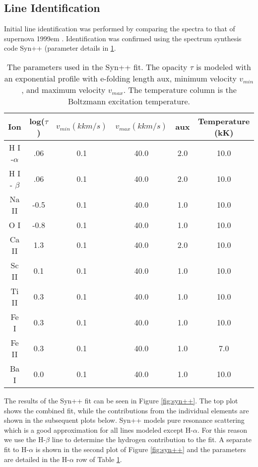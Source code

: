 \documentclass[preprint]{aastex61}
\begin{document}
\subsection{Line Identification}
Initial line identification was performed by comparing the spectra to that of supernova 1999em \citep{2001leonard}. 
Identification was confirmed using the spectrum synthesis code Syn++ \citep{2013thomas} (parameter details in \ref{tab:syn++}. 
\begin{table}[htp]
\caption{The parameters used in the Syn++ fit. 
The opacity $\tau$ is modeled with an exponential profile with e-folding length aux, minimum velocity $v_{min}$, and maximum velocity $v_{max}$. 
The temperature column is the Boltzmann excitation temperature.}
\begin{center}
\begin{tabular}{c|c|c|c|c|c}
Ion & log($\tau$) & $v_{min}(kkm/s)$ & $v_{max}(kkm/s)$ & aux & Temperature (kK) \\
\hline
  H I -$\alpha$   & .06 & 0.1 & 40.0 & 2.0 & 10.0 \\
  H I - $\beta$   & .06 & 0.1 & 40.0 & 2.0 & 10.0 \\
  Na II & -0.5 & 0.1 & 40.0 & 1.0 & 10.0 \\
  O I & -0.8 & 0.1 & 40.0 & 1.0 & 10.0 \\
  Ca II & 1.3 & 0.1 & 40.0 & 2.0 & 10.0 \\
  Sc II & 0.1 & 0.1 & 40.0 & 1.0 & 10.0 \\
  Ti II  & 0.3 & 0.1 & 40.0 & 1.0 & 10.0 \\
  Fe I  &  0.3 & 0.1 & 40.0 & 1.0 & 10.0 \\
  Fe II & 0.3 & 0.1 & 40.0 & 1.0 & 7.0 \\
  Ba I & 0.0 & 0.1 & 40.0 & 1.0 & 10.0 \\  
 \end{tabular}
\end{center}
\label{tab:syn++}
\end{table}
The results of the Syn++ fit can be seen in Figure \ref{fig:syn++}.
The top plot shows the combined fit, while the contributions from the individual elements are shown in the subsequent plots below.
Syn++ models pure resonance scattering which is a good approximation for all lines modeled except H-$\alpha$. 
For this reason we use the H-$\beta$ line to determine the hydrogen contribution to the fit. 
A separate fit to H-$\alpha$ is shown in the second plot of Figure \ref{fig:syn++} and the parameters are detailed in the H-$\alpha$ row of Table \ref{tab:syn++}.
\end{document}
